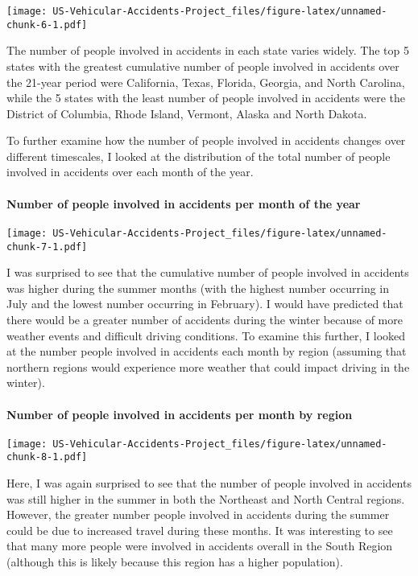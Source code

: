 \documentclass[]{article}
\let\oldparagraph\paragraph
\renewcommand{\paragraph}[1]{\oldparagraph{#1}\mbox{}}
\begin{document}
\texttt{[image: US-Vehicular-Accidents-Project\_files/figure-latex/unnamed-chunk-6-1.pdf]}

The number of people involved in accidents in each state varies widely.
The top 5 states with the greatest cumulative number of people involved
in accidents over the 21-year period were California, Texas, Florida,
Georgia, and North Carolina, while the 5 states with the least number of
people involved in accidents were the District of Columbia, Rhode
Island, Vermont, Alaska and North Dakota.

To further examine how the number of people involved in accidents
changes over different timescales, I looked at the distribution of the
total number of people involved in accidents over each month of the
year.

\hypertarget{number-of-people-involved-in-accidents-per-month-of-the-year}{%
\paragraph{Number of people involved in accidents per month of the
year}\label{number-of-people-involved-in-accidents-per-month-of-the-year}}

\texttt{[image: US-Vehicular-Accidents-Project\_files/figure-latex/unnamed-chunk-7-1.pdf]}

I was surprised to see that the cumulative number of people involved in
accidents was higher during the summer months (with the highest number
occurring in July and the lowest number occurring in February). I would
have predicted that there would be a greater number of accidents during
the winter because of more weather events and difficult driving
conditions. To examine this further, I looked at the number people
involved in accidents each month by region (assuming that northern
regions would experience more weather that could impact driving in the
winter).

\hypertarget{number-of-people-involved-in-accidents-per-month-by-region}{%
\paragraph{Number of people involved in accidents per month by
region}\label{number-of-people-involved-in-accidents-per-month-by-region}}

\texttt{[image: US-Vehicular-Accidents-Project\_files/figure-latex/unnamed-chunk-8-1.pdf]}

Here, I was again surprised to see that the number of people involved in
accidents was still higher in the summer in both the Northeast and North
Central regions. However, the greater number people involved in
accidents during the summer could be due to increased travel during
these months. It was interesting to see that many more people were
involved in accidents overall in the South Region (although this is
likely because this region has a higher population).
\end{document}

